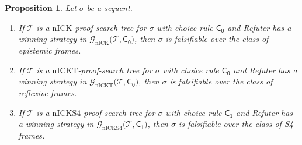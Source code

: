 \documentclass{myifcolog}
\newcommand{\nick}{\mathrm{nICK}}
\newcommand{\nickt}{\mathrm{nICKT}}
\newcommand{\nicks}{\mathrm{nICKS4}}
\newtheorem{proposition}[theorem]{Proposition}
\numberwithin{theorem}{section}
\begin{document}
 
\begin{proposition}\label{p: refutation gives triangle model}
Let $\sigma$ be a sequent.
\begin{enumerate}
    \item If $\mathcal{T}$ is a $\nick$-proof-search tree for $\sigma$ with choice rule $\mathsf{C_0}$ and Refuter has a winning strategy in $\mathcal{G}_\nick(\mathcal{T}, \mathsf{C_0)}$, then $\sigma$ is falsifiable over the class of epistemic frames.

    \item If $\mathcal{T}$ is a $\nickt$-proof-search tree for $\sigma$ with choice rule $\mathsf{C_0}$ and Refuter has a winning strategy in $\mathcal{G}_\nickt(\mathcal{T}, \mathsf{C_0)}$, then $\sigma$ is falsifiable over the class of reflexive frames.

    \item If $\mathcal{T}$ is a $\nicks$-proof-search tree for $\sigma$ with choice rule $\mathsf{C_1}$ and Refuter has a winning strategy in $\mathcal{G}_\nicks(\mathcal{T}, \mathsf{C_1)}$, then $\sigma$ is falsifiable over the class of S4 frames.
\end{enumerate}



\end{proposition}
\end{document}

